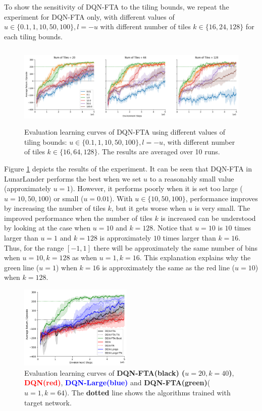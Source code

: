 \documentclass{article}
\begin{document}
To show the sensitivity of DQN-FTA to the tiling bounds, we repeat the experiment for DQN-FTA only, with different values of $u \in \{0.1,1,10,50,100\}, 
l = -u$ with different number of tiles $k \in \{16, 24, 128\}$ for each tiling bounds.

\begin{figure}[h]
    \centering
    \includegraphics[height=4cm]{sweepfta.png}
    \caption{Evaluation learning curves of DQN-FTA using different values of tiling bounds: $u \in \{0.1, 1, 10, 50, 100\}, l = -u$, 
    with different number of tiles $k \in \{16, 64, 128\}$. The results are averaged over 10 runs.}
    \label{fig:sweepfta}
\end{figure}

Figure \ref{fig:sweepfta} depicts the results of the experiment.
It can be seen that DQN-FTA in LunarLander performs the best when we set $u$ to a reasonably small value (approximately $u = 1$).
However, it performs poorly when it is set too large ($u=10, 50, 100$) or small ($u=0.01$).
With $u \in \{10, 50, 100\}$, performance improves by increasing the number of tiles $k$, but it gets worse when $u$ is very small.
The improved performance when the number of tiles $k$ is increased can be understood by looking at the case when $u=10$ and $k=128$.
Notice that $u=10$ is $10$ times larger than $u=1$ and $k=128$ is approximately $10$ times larger than $k=16$.
Thus, for the range $[-1, 1]$ there will be approximately the same number of bins when $u=10, k=128$ as when $u=1, k=16$.
This explanation explains why the green line ($u=1$) when $k=16$ is approximately the same as the red line ($u=10$) when $k=128$.

\begin{figure}[h]
    \centering
    \includegraphics[height=4cm]{bestfta.png}
    \caption{Evaluation learning curves of {\bf DQN-FTA(black) ($u=20, k = 40$)}, {\textcolor{red} {\bf DQN(red)}},  {\textcolor{blue} {\bf DQN-Large(blue)}} and {\textcolor{mygreen} {\bf DQN-FTA(green)}($u=1, k=64$)}. The {\bf dotted} line shows the algorithms trained with target network.}
    \label{fig:bestfta}
\end{figure}
\end{document}
